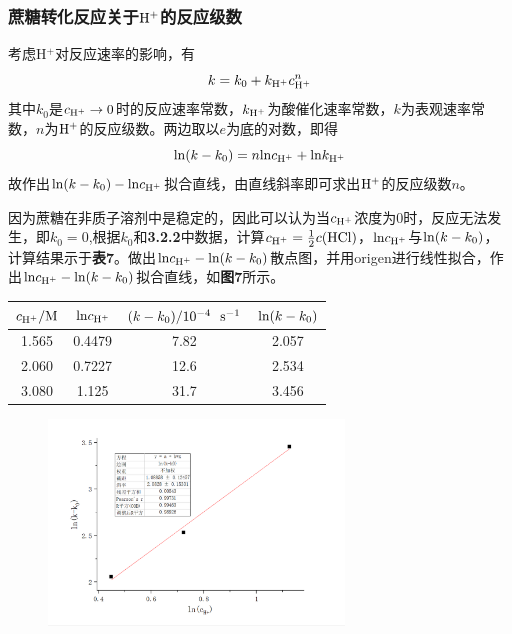 \documentclass[12pt]{article}
\begin{document}
					\subsubsection{蔗糖转化反应关于$\rm H^{+}$的反应级数}
					考虑H$^{+}$对反应速率的影响，有
					$$
					k=k_{0}+k_{\rm H^{+}}c^{n}_{\rm H^{+}}
					$$
					其中$k_{0}$是$c_{\rm H^{+}}\rightarrow0$时的反应速率常数，$k_{\rm H^{+}}$为酸催化速率常数，$k$为表观速率常数，$n$为$\rm H^{+}$的反应级数。两边取以$e$为底的对数，即得
					$$
					{\rm ln}(k-k_{0})=n{\rm ln}c_{\rm H^{+}}+{\rm ln}k_{\rm H^{+}}
					$$
					故作出${\rm ln}(k-k_{0})-{\rm ln}c_{\rm H^{+}}$拟合直线，由直线斜率即可求出$\rm H^{+}$的反应级数$n$。\par 
					因为蔗糖在非质子溶剂中是稳定的，因此可以认为当$c_{\rm H^{+}}$浓度为0时，反应无法发生，即$k_{0}=0$,根据$k_{0}$和\textbf{3.2.2}中数据，计算$c_{\rm H^{+}}=\frac{1}{2}c({\rm HCl})$，${\rm ln}c_{\rm H^{+}}$与${\rm ln}(k-k_{0})$，计算结果示于\textbf{表7}。做出${\rm ln}c_{\rm H^{+}}-{\rm ln}(k-k_{0})$散点图，并用origen进行线性拟合，作出${\rm ln}c_{\rm H^{+}}-{\rm ln}(k-k_{0})$拟合直线，如\textbf{图7}所示。
					\begin{table}[h]
						\centering
						\begin{tabular}{cccc}
							\toprule
							
							$c_{\rm H^{+}} / {\rm M}$ & ${\rm ln}c_{\rm H^{+}}$ & $(k-k_{0})/{\rm 10^{-4} \ \ s^{-1}}$ & ${\rm ln}(k-k_{0})$\\
							\midrule
							1.565 & 0.4479 &  7.82 &  2.057\\
							2.060 & 0.7227 & 12.6 & 2.534 \\
							3.080 & 1.125 & 31.7 & 3.456 \\
							\bottomrule
						\end{tabular}
					\end{table}
					\par
					\begin{figure}[h]
						\centering
						\includegraphics[width=0.70\textwidth]{7.png}
					\end{figure}
\end{document}
